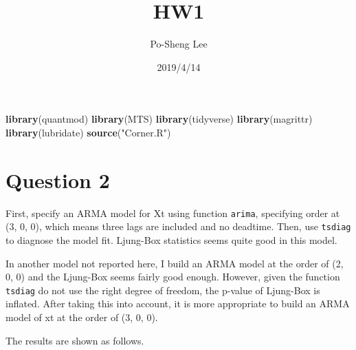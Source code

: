 \documentclass[]{article}
\title{HW1}
\author{Po-Sheng Lee}
\date{2019/4/14}
\newenvironment{Shaded}{\begin{snugshade}}{\end{snugshade}}
\newcommand{\KeywordTok}[1]{\textcolor[rgb]{0.13,0.29,0.53}{\textbf{#1}}}
\newcommand{\DataTypeTok}[1]{\textcolor[rgb]{0.13,0.29,0.53}{#1}}
\newcommand{\DecValTok}[1]{\textcolor[rgb]{0.00,0.00,0.81}{#1}}
\newcommand{\StringTok}[1]{\textcolor[rgb]{0.31,0.60,0.02}{#1}}
\newcommand{\OtherTok}[1]{\textcolor[rgb]{0.56,0.35,0.01}{#1}}
\newcommand{\OperatorTok}[1]{\textcolor[rgb]{0.81,0.36,0.00}{\textbf{#1}}}
\newcommand{\NormalTok}[1]{#1}
\begin{document}
\maketitle

\begin{Shaded}
\begin{Highlighting}[]
\KeywordTok{library}\NormalTok{(quantmod)}
\KeywordTok{library}\NormalTok{(MTS)}
\KeywordTok{library}\NormalTok{(tidyverse)}
\KeywordTok{library}\NormalTok{(magrittr)}
\KeywordTok{library}\NormalTok{(lubridate)}
\KeywordTok{source}\NormalTok{(}\StringTok{"Corner.R"}\NormalTok{)}
\end{Highlighting}
\end{Shaded}

\section{Question 2}\label{question-2}

First, specify an ARMA model for Xt using function \texttt{arima},
specifying order at (3, 0, 0), which means three lags are included and
no deadtime. Then, use \texttt{tsdiag} to diagnose the model fit.
Ljung-Box statistics seems quite good in this model.

In another model not reported here, I build an ARMA model at the order
of (2, 0, 0) and the Ljung-Box seems fairly good enough. However, given
the function \texttt{tsdiag} do not use the right degree of freedom, the
p-value of Ljung-Box is inflated. After taking this into account, it is
more appropriate to build an ARMA model of xt at the order of (3, 0, 0).

The results are shown as follows.

\begin{Shaded}
\end{Shaded}
\end{document}
